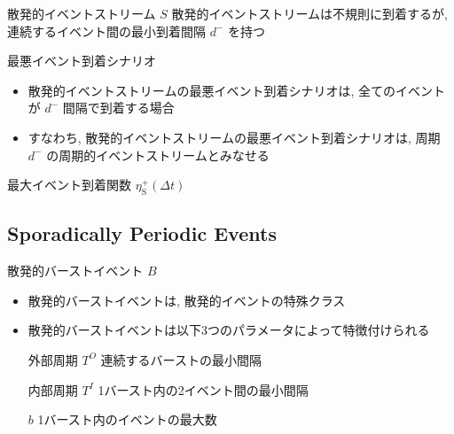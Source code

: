 \begin{frame}{散発的イベントストリーム $S$}
    散発的イベントストリームは不規則に到着するが, 連続するイベント間の最小到着間隔 $d^{-}$ を持つ
\end{frame}

\begin{frame}{最悪イベント到着シナリオ}
    \begin{itemize}
        \item 散発的イベントストリームの最悪イベント到着シナリオは, 全てのイベントが $d^{-}$ 間隔で到着する場合
        \item すなわち, 散発的イベントストリームの最悪イベント到着シナリオは, 周期 $d^{-}$ の周期的イベントストリームとみなせる
    \end{itemize}
\end{frame}

\begin{frame}{最大イベント到着関数 $\eta_{\mathrm{S}}^{+}(\Delta t)$}
\end{frame}


\subsection{Sporadically Periodic Events}
\label{ssec: sporadically periodic events}

\begin{frame}{散発的バーストイベント $B$}
    \begin{itemize}
        \item 散発的バーストイベントは, 散発的イベントの特殊クラス
        \item 散発的バーストイベントは以下3つのパラメータによって特徴付けられる
              \begin{block}{外部周期 $T^{O}$}
                  連続するバーストの最小間隔
              \end{block}
              \begin{block}{内部周期 $T^{I}$}
                1バースト内の2イベント間の最小間隔
            \end{block}
            \begin{block}{$b$}
                1バースト内のイベントの最大数
            \end{block}
    \end{itemize}
\end{frame}

